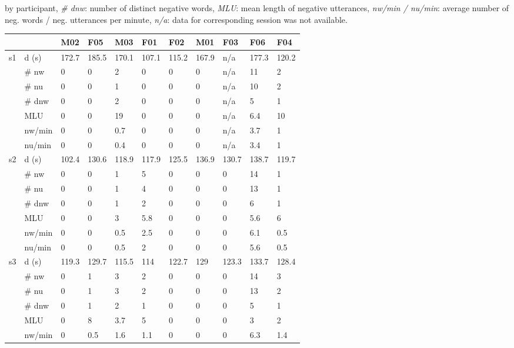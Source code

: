 \begin{screenonly}
\begin{table*}[h]
\begin{center}
{      by participant, \textsl{\# dnw}: number of distinct negative words, \textsl{MLU}: mean length of negative utterances, \textsl{nw/min / nu/min}:
      average number of neg. words / neg. utterances per minute, \textsl{n/a}: data for corresponding session was not available.}
    \label{tbl_neg_utt_S}
    \begin{tabular*}{\hsize}{@{\extracolsep{\fill}}lllllllllll}
      \toprule
      & & M02 & F05 & M03 & F01 & F02 & M01 & F03 & F06 & F04\\
      \midrule
      \multirow{7}{*}{s1} & d (s) & 172.7 & 185.5 & 170.1 & 107.1 & 115.2 & 167.9 & n/a & 177.3 & 120.2\\
      & \# nw & 0 & 0 & 2 & 0 & 0 & 0 & n/a & 11 & 2\\
      & \# nu & 0 & 0 & 1 & 0 & 0 & 0 & n/a & 10 & 2\\
      & \# dnw & 0 & 0 & 2 & 0 & 0 & 0 & n/a & 5 & 1\\
      & MLU & 0 & 0 & 19 & 0 & 0 & 0 & n/a & 6.4 & 10\\
      & nw/min & 0 & 0 & 0.7 & 0 & 0 & 0 & n/a & 3.7 & 1\\
      & nu/min & 0 & 0 & 0.4 & 0 & 0 & 0 & n/a & 3.4 & 1\\
      \cmidrule{2-11}
      \multirow{7}{*}{s2} & d (s) & 102.4 & 130.6 & 118.9 & 117.9 & 125.5 & 136.9 & 130.7 & 138.7 & 119.7\\
      & \# nw & 0 & 0 & 1 & 5 & 0 & 0 & 0 & 14 & 1\\
      & \# nu & 0 & 0 & 1 & 4 & 0 & 0 & 0 & 13 & 1\\
      & \# dnw & 0 & 0 & 1 & 2 & 0 & 0 & 0 & 6 & 1\\
      & MLU & 0 & 0 & 3 & 5.8 & 0 & 0 & 0 & 5.6 & 6\\
      & nw/min & 0 & 0 & 0.5 & 2.5 & 0 & 0 & 0 & 6.1 & 0.5\\
      & nu/min & 0 & 0 & 0.5 & 2 & 0 & 0 & 0 & 5.6 & 0.5\\
      \cmidrule{2-11}
      \multirow{7}{*}{s3} & d (s) & 119.3 & 129.7 & 115.5 & 114 & 122.7 & 129 & 123.3 & 133.7 & 128.4\\
      & \# nw & 0 & 1 & 3 & 2 & 0 & 0 & 0 & 14 & 3\\
      & \# nu & 0 & 1 & 3 & 2 & 0 & 0 & 0 & 13 & 2\\
      & \# dnw & 0 & 1 & 2 & 1 & 0 & 0 & 0 & 5 & 1\\
      & MLU & 0 & 8 & 3.7 & 5 & 0 & 0 & 0 & 3 & 2\\
      & nw/min & 0 & 0.5 & 1.6 & 1.1 & 0 & 0 & 0 & 6.3 & 1.4\\

\end{tabular*}
\end{center}
\end{table*}
\end{screenonly}
